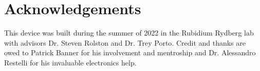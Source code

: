 \documentclass{article}
\begin{document}
\section{Acknowledgements}
This device was built during the summer of 2022 in the Rubidium Rydberg lab with advisors Dr. Steven Rolston and Dr. Trey Porto. Credit and thanks are owed to Patrick Banner for his involvement and mentroship and Dr. Alessandro Restelli for his invaluable electronics help.





\printbibliography
\end{document}
